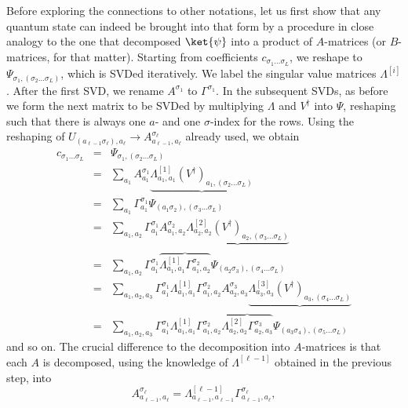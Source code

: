 Before exploring the connections to other notations, let us first show that any quantum state can indeed be brought into that form by a procedure in close analogy to the one that decomposed $\ket{\psi}$ into a product of $A$-matrices (or $B$-matrices, for that matter). Starting from coefficients $c_{\sigma_1\ldots\sigma_L}$, we reshape to $\Psi_{\sigma_1, (\sigma_2 \ldots \sigma_L)}$, which is SVDed iteratively. We label the singular value matrices $\Lambda^{[i]}$. After the first SVD, we rename $A^{\sigma_1}$ to $\Gamma^{\sigma_1}$. In the subsequent SVDs, as before we form the next matrix to be SVDed by multiplying $\Lambda$ and $V^\dagger$ into $\Psi$, reshaping such that there is always one $a$- and one $\sigma$-index for the rows. Using the reshaping of $U_{(a_{\ell-1}\sigma_\ell), a_{\ell}} \rightarrow A^{\sigma_\ell}_{a_{\ell-1},a_\ell}$ already used, we obtain
\begin{eqnarray*}
c_{\sigma_1\ldots\sigma_L} &=& \Psi_{\sigma_1, (\sigma_2 \ldots \sigma_L)} \\
&=& \sum_{a_1} A^{\sigma_1}_{a_1} \underbrace{\Lambda^{[1]}_{a_1,a_1} (V^\dagger)_{a_1, (\sigma_2 \ldots \sigma_L)}} \\
&=& \sum_{a_1} \Gamma^{\sigma_1}_{a_1} \Psi_{(a_1\sigma_2), (\sigma_3 \ldots \sigma_L)} \\
&=& \sum_{a_1,a_2} \Gamma^{\sigma_1}_{a_1} A^{\sigma_2}_{a_1,a_2} \underbrace{\Lambda^{[2]}_{a_2,a_2} (V^\dagger)_{a_2, (\sigma_3 \ldots \sigma_L)}} \\
&=& \sum_{a_1,a_2} \Gamma^{\sigma_1}_{a_1} \overbrace{\Lambda^{[1]}_{a_1,a_1} \Gamma^{\sigma_2}_{a_1,a_2}} \Psi_{(a_2\sigma_3), (\sigma_4 \ldots \sigma_L)} \\
&=& \sum_{a_1,a_2,a_3} \Gamma^{\sigma_1}_{a_1} \Lambda^{[1]}_{a_1,a_1} \Gamma^{\sigma_2}_{a_1,a_2} A^{\sigma_3}_{a_2,a_3}  \underbrace{\Lambda^{[3]}_{a_3,a_3} (V^\dagger)_{a_3, (\sigma_4 \ldots \sigma_L)}} \\ 
&=& \sum_{a_1,a_2,a_3} \Gamma^{\sigma_1}_{a_1} \Lambda^{[1]}_{a_1,a_1} \Gamma^{\sigma_2}_{a_1,a_2} \overbrace{\Lambda^{[2]}_{a_2,a_2} \Gamma^{\sigma_3}_{a_2,a_3}}  \Psi_{(a_3\sigma_4), (\sigma_5 \ldots \sigma_L)} 
\end{eqnarray*}
and so on. The crucial difference to the decomposition into $A$-matrices is that each $A$ is decomposed, using the knowledge of $\Lambda^{[\ell-1]}$ obtained in the previous step, into 
\begin{equation}
A^{\sigma_\ell}_{a_{\ell-1},a_\ell} = \Lambda^{[\ell-1]}_{a_{\ell-1},a_{\ell-1}} \Gamma^{\sigma_\ell}_{a_{\ell-1},a_\ell} ,
\label{eq:agammalambda}
\end{equation}
